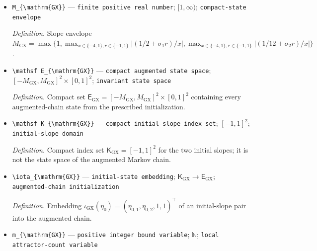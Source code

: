 \documentclass{article}
\begin{document}
\begin{itemize}
  \par\smallskip\noindent\emph{Definition.} Sufficient state \(Z^{\mathrm{GX}}_t=(\widehat\beta^{\mathrm{GX}}_{t,1},\widehat\beta^{\mathrm{GX}}_{t,2},q^{\mathrm{GX}}_{t,1},q^{\mathrm{GX}}_{t,2})^\top\) for the bounded clipped-LinUCB recursion.
  \item \texttt{M\_\allowbreak{}\{\textbackslash{}\allowbreak{}mathrm\{GX\}\allowbreak{}\}\allowbreak{}} --- \texttt{finite positive real number}; \([1,\infty)\); \texttt{compact-\allowbreak{}state envelope}
  \par\smallskip\noindent\emph{Definition.} Slope envelope \(M_{\mathrm{GX}}=\max\{1,\max_{x\in\{-4,1\},r\in\{-1,1\}}|(1/2+\sigma_1r)/x|,\max_{x\in\{-4,1\},r\in\{-1,1\}}|(1/12+\sigma_2r)/x|\}\).
  \item \texttt{\textbackslash{}\allowbreak{}mathsf E\_\allowbreak{}\{\textbackslash{}\allowbreak{}mathrm\{GX\}\allowbreak{}\}\allowbreak{}} --- \texttt{compact augmented state space}; \([-M_{\mathrm{GX}},M_{\mathrm{GX}}]^2\times[0,1]^2\); \texttt{invariant state space}
  \par\smallskip\noindent\emph{Definition.} Compact set \(\mathsf E_{\mathrm{GX}}=[-M_{\mathrm{GX}},M_{\mathrm{GX}}]^2\times[0,1]^2\) containing every augmented-chain state from the prescribed initialization.
  \item \texttt{\textbackslash{}\allowbreak{}mathsf K\_\allowbreak{}\{\textbackslash{}\allowbreak{}mathrm\{GX\}\allowbreak{}\}\allowbreak{}} --- \texttt{compact initial-\allowbreak{}slope index set}; \([-1,1]^2\); \texttt{initial-\allowbreak{}slope domain}
  \par\smallskip\noindent\emph{Definition.} Compact index set \(\mathsf K_{\mathrm{GX}}=[-1,1]^2\) for the two initial slopes; it is not the state space of the augmented Markov chain.
  \item \texttt{\textbackslash{}\allowbreak{}iota\_\allowbreak{}\{\textbackslash{}\allowbreak{}mathrm\{GX\}\allowbreak{}\}\allowbreak{}} --- \texttt{initial-\allowbreak{}state embedding}; \(\mathsf K_{\mathrm{GX}}\to\mathsf E_{\mathrm{GX}}\); \texttt{augmented-\allowbreak{}chain initialization}
  \par\smallskip\noindent\emph{Definition.} Embedding \(\iota_{\mathrm{GX}}(\eta_0)=(\eta_{0,1},\eta_{0,2},1,1)^\top\) of an initial-slope pair into the augmented chain.
  \item \texttt{m\_\allowbreak{}\{\textbackslash{}\allowbreak{}mathrm\{GX\}\allowbreak{}\}\allowbreak{}} --- \texttt{positive integer bound variable}; \(\mathbb N\); \texttt{local attractor-\allowbreak{}count variable}

\end{itemize}
\end{document}
